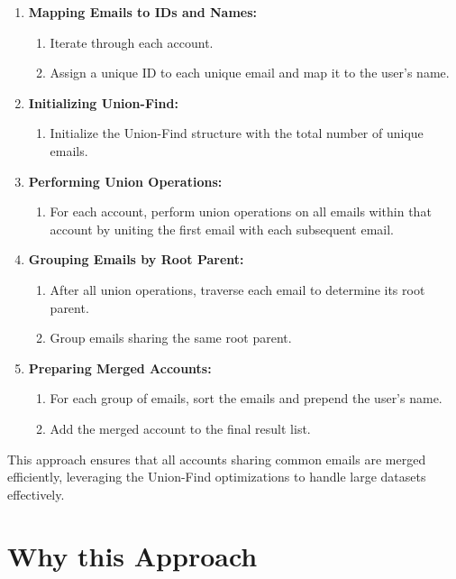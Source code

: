\begin{enumerate}
    \item \textbf{Mapping Emails to IDs and Names:}
    \begin{enumerate}
        \item Iterate through each account.
        \item Assign a unique ID to each unique email and map it to the user's name.
    \end{enumerate}

    \item \textbf{Initializing Union-Find:}
    \begin{enumerate}
        \item Initialize the Union-Find structure with the total number of unique emails.
    \end{enumerate}

    \item \textbf{Performing Union Operations:}
    \begin{enumerate}
        \item For each account, perform union operations on all emails within that account by uniting the first email with each subsequent email.
    \end{enumerate}

    \item \textbf{Grouping Emails by Root Parent:}
    \begin{enumerate}
        \item After all union operations, traverse each email to determine its root parent.
        \item Group emails sharing the same root parent.
    \end{enumerate}

    \item \textbf{Preparing Merged Accounts:}
    \begin{enumerate}
        \item For each group of emails, sort the emails and prepend the user's name.
        \item Add the merged account to the final result list.
    \end{enumerate}
\end{enumerate}

This approach ensures that all accounts sharing common emails are merged efficiently, leveraging the Union-Find optimizations to handle large datasets effectively.

\section*{Why this Approach}

